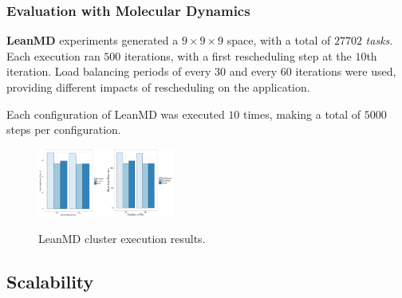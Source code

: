 \subsubsection*{Evaluation with Molecular Dynamics}

\textbf{LeanMD} experiments generated a $9\times9\times9$ space, with a total of $27702$ \textit{tasks}.
Each execution ran $500$ iterations, with a first rescheduling step at the $10$th iteration. 
Load balancing periods of every $30$ and every $60$ iterations were used, providing different impacts of rescheduling on the application.

Each configuration of LeanMD was executed $10$ times, making a total of $5000$ steps per configuration. 


\begin{figure}
	\centering
    \includegraphics[width=0.2\textwidth]{images/apptime_leanmd_g5k.pdf}\includegraphics[width=0.2\textwidth]{images/steptime_leanmd_g5k.pdf}
    \caption{LeanMD cluster execution results.}
    \label{fig:eval:g5k:leanmd:time}
\end{figure}

\subsection{Scalability}